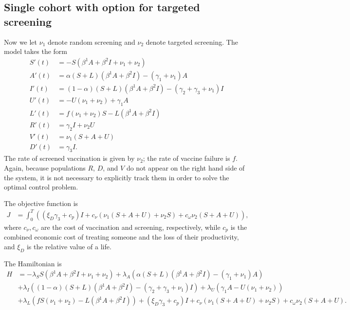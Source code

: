 \documentclass[english,12pt,letter]{article}
\begin{document}
\subsection{Single cohort with option for targeted screening}
Now we let $\nu_1$ denote random screening and $\nu_2$ denote targeted screening.
The model takes the form
\begin{align}
    S'(t) & = -S(\beta^1 A + \beta^2 I + \nu_1 + \nu_2) \\
    A'(t) & = \alpha (S+L) (\beta^1 A + \beta^2 I) - (\gamma_1 + \nu_1) A \\
    I'(t) & = (1-\alpha) (S+L) (\beta^1 A + \beta^2 I) - (\gamma_2 + \gamma_3 + \nu_1) I \\
    U'(t) & = -U (\nu_1 + \nu_2) + \gamma_1 A \\
    L'(t) & = f(\nu_1+\nu_2)S - L(\beta^1 A + \beta^2 I) \\
    R'(t) & = \gamma_2 I + \nu_2 U \\
    V'(t) & = \nu_1 (S + A + U) \\
    D'(t) & = \gamma_3 I.
\end{align}
The rate of screened vaccination is given by $\nu_2$; the rate of vaccine failure is $f$.
Again, because populations $R$, $D$, and $V$ do not appear on the right hand side of the
system, it is not necessary to explicitly track them in order to solve the optimal control problem.

The objective function is
\begin{align}
    J & = \int_0^T \left( (\xi_D \gamma_3 + c_p) I + c_\nu (\nu_1 (S+A+U) + \nu_2 S) + c_\omega \nu_2 (S+A+U)\right),
\end{align}
where $c_\nu, c_\omega$ are the cost of vaccination and screening, respectively, while $c_p$ is the
combined economic cost of treating someone and the loss of their productivity, and $\xi_D$ is the
relative value of a life.

The Hamiltonian is
\begin{align*}
    H & =  -\lambda_S S (\beta^1 A + \beta^2 I + \nu_1 + \nu_2)
            + \lambda_A ( \alpha(S+L)(\beta^1 A + \beta^2 I) - (\gamma_1+\nu_1) A) \\
      &     + \lambda_I ( (1-\alpha)(S+L)(\beta^1 A + \beta^2 I) - (\gamma_2 + \gamma_3 + \nu_1) I )
            + \lambda_U ( \gamma_1 A - U(\nu_1 + \nu_2) ) \\
      &     + \lambda_L ( fS(\nu_1 + \nu_2) - L(\beta^1 A + \beta^2 I) )
            + (\xi_D \gamma_3 + c_p) I + c_\nu (\nu_1 (S+A+U) + \nu_2 S) + c_\omega \nu_2 (S+A+U).
\end{align*}
\end{document}
